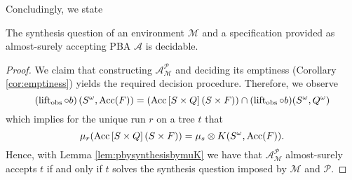 Concludingly, we state
\begin{theorem}
  The synthesis question of an environment $\mathcal{M}$ and a specification
  provided as almost-surely accepting \ac{PBA} $\mathcal{A}$ is decidable.
  \label{thm:pbasynthesis}
\end{theorem}
\begin{proof}
  We claim that constructing $\mathcal{A}_{\mathcal{M}}^{\mathcal{P}}$ and
  deciding its emptiness (Corollary \ref{cor:emptiness}) yields the required
  decision procedure. Therefore, we observe
  \begin{equation*}
    \left(\operatorname{lift}_{\operatorname{obs}}\circ b\right)(S^{\omega}, \operatorname{Acc}(F)) = 
      (\operatorname{Acc}\left[S\times Q\right](S\times F))
      \cap(\operatorname{lift}_{\operatorname{obs}}\circ b)(S^{\omega}, Q^{\omega})
  \end{equation*}
  which implies  for the unique run $r$ on a tree $t$ that
  \begin{equation*}
    \mu_{r}(\operatorname{Acc}\left[S\times Q\right](S\times F))
    = \mu_{s}\otimes K(S^{\omega}, \operatorname{Acc}(F)).
  \end{equation*}
  Hence, with Lemma \ref{lem:pbysynthesisbymuK} we have that 
  $\mathcal{A}_{\mathcal{M}}^{\mathcal{P}}$ almost-surely accepts $t$ if and
  only if $t$ solves the synthesis question imposed by $\mathcal{M}$ and
  $\mathcal{P}$.
\end{proof}

